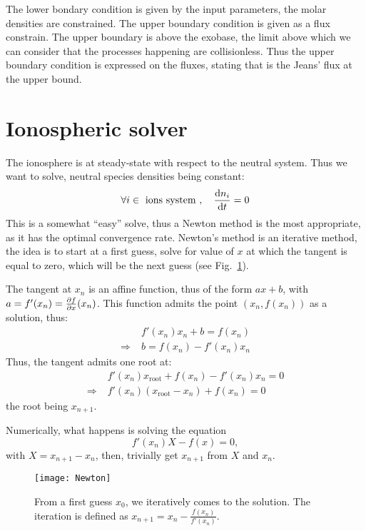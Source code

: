 The lower bondary condition is given by the input parameters, the molar densities
are constrained. The upper boundary condition is given as a flux constrain. The
upper boundary is above the exobase, the limit above which we can consider that
the processes happening are collisionless. Thus the upper boundary condition
is expressed on the fluxes, stating that \doverdz{\conc} is the Jeans' flux
at the upper bound.

\section{Ionospheric solver}

The ionosphere is at steady-state with respect to the
neutral system. Thus we want to solve, neutral species
densities being constant:
\begin{equation}
\forall i \in \text{ ions system },\quad \frac{\mathrm{d} n_i}{\mathrm{d} t} = 0
\label{ionosphere:steady_state}
\end{equation}
%
This is a somewhat ``easy'' solve, thus a Newton method is the
most appropriate, as it has the optimal convergence rate.
Newton's method is an iterative method, the idea is to start
at a first guess, solve for value of $x$ at which the tangent is
equal to zero, which will be the next guess (see Fig.~\ref{Newton:solve}).

The tangent at $x_n$ is an affine function, thus of the form
$ax + b$, with $a = f'(x_n) = \frac{\partial f}{\partial x}(x_n)$. This function
admits the point $(x_n,f(x_n))$ as a solution, thus:
\begin{equation}
\begin{split}
              & f'(x_n) x_n + b = f(x_n) \\
\Rightarrow\; & b = f(x_n) - f'(x_n) x_n
\end{split}
\label{Newton:tangent}
\end{equation}
Thus, the tangent admits one root at:
\begin{equation}
\begin{split}
              & f'(x_n) x_\text{root} + f(x_n) - f'(x_n) x_n = 0 \\
\Rightarrow\; & f'(x_n) \left(x_\text{root} - x_n \right) + f(x_n) = 0
\end{split}
\label{Newton:tangent:root}
\end{equation}
the root being $x_{n+1}$.

Numerically, what happens is solving the equation
\begin{equation}
f'(x_n)X - f(x) = 0,
\label{Newton:solving}
\end{equation}
with $X = x_{n+1} - x_n$, then, trivially get $x_{n+1}$ from
$X$ and $x_n$.
\begin{figure}
\centering
\texttt{[image: Newton]}
\caption{\label{Newton:solve}From a first guess $x_0$, we iteratively
comes to the solution. The iteration is defined as $x_{n+1} = x_n - \frac{f(x_n)}{f'(x_n)}$.}
\end{figure}

